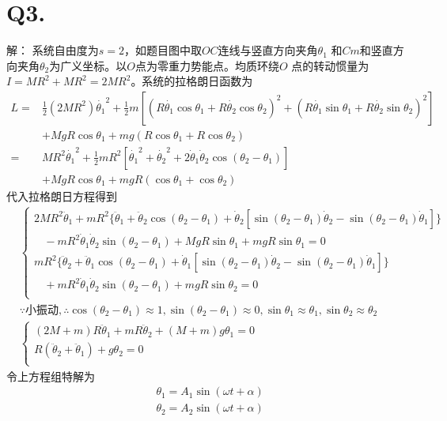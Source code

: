 \documentclass[10pt,a4paper]{article}
\begin{document}
\section*{Q3.}解：
系统自由度为$s=2$，如题目图中取$OC$连线与竖直方向夹角$\theta_1$ 和$Cm$和竖直方向夹角$\theta_2$为广义坐标。以$O$点为零重力势能点。均质环绕$O$ 点的转动惯量为$I=MR^2+MR^2=2MR^2$。系统的拉格朗日函数为
\begin{align*}
L=&\frac{1}{2}(2MR^2)\dot{\theta_1}^2+\frac{1}{2}m[(R\dot{\theta_1}\cos\theta_1+R\dot{\theta_2}\cos\theta_2)^2+(R\dot{\theta_1}\sin\theta_1+R\dot{\theta_2}\sin\theta_2)^2]\\
&+MgR\cos\theta_1+mg(R\cos\theta_1+R\cos\theta_2)\\
=&MR^2\dot{\theta_1}^2+\frac{1}{2}mR^2[\dot{\theta_1}^2+\dot{\theta_2}^2+2\dot{\theta}_1\dot{\theta}_2\cos(\theta_2-\theta_1)]\\
&+MgR\cos\theta_1+mgR(\cos\theta_1+\cos\theta_2)
\end{align*}
代入拉格朗日方程得到
\begin{align*}
&\left\{\begin{array}{llll}
2MR^2\ddot{\theta}_1+mR^2\{\ddot{\theta}_1+\ddot{\theta}_2\cos(\theta_2-\theta_1)+\dot{\theta}_2[\sin(\theta_2-\theta_1)\dot{\theta}_2-\sin(\theta_2-\theta_1)\dot{\theta}_1]\}\\
~~~~-mR^2\dot{\theta}_1\dot{\theta}_2\sin(\theta_2-\theta_1)+MgR\sin\theta_1+mgR\sin\theta_1=0\\
mR^2\{\ddot{\theta}_2+\ddot{\theta}_1\cos(\theta_2-\theta_1)+\dot{\theta}_1[\sin(\theta_2-\theta_1)\dot{\theta}_2-\sin(\theta_2-\theta_1)\dot{\theta}_1]\}\\
~~~~+mR^2\dot{\theta}_1\dot{\theta}_2\sin(\theta_2-\theta_1)+mgR\sin\theta_2=0\\
\end{array}\right.\\
&\because\text{小振动}, \therefore \cos(\theta_2-\theta_1)\approx1, \sin(\theta_2-\theta_1)\approx0, \sin\theta_1\approx\theta_1, \sin\theta_2\approx\theta_2\\
&\left\{\begin{array}{ll}
(2M+m)R\ddot{\theta}_1+mR\ddot{\theta}_2+(M+m)g\theta_1=0\\
R(\ddot{\theta}_2+\ddot{\theta}_1)+g\theta_2=0\\
\end{array}\right.
\end{align*}
令上方程组特解为
\begin{align*}
&\theta_1=A_1\sin(\omega t+\alpha)\\
&\theta_2=A_2\sin(\omega t+\alpha)
\end{align*}
\end{document}
